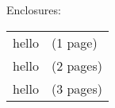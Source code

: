
\renewcommand{\recipprefix}{Subunit\\}
\renewcommand{\recip}{Company}
\renewcommand{\comp}{Program} %
\renewcommand{\recipaddress}{Street\\
City, Prov\hspace{6pt}xxx~xxx\\
Canada}

\renewcommand{\addressprefix}{}
\renewcommand{\addresssuffix}{\\
(604) 222-1047 ext. 6859
| \href{mailto:lighthall@triumf.ca}{lighthall@triumf.ca}\\%
}


\vspace*{2.0\baselineskip}
\noindent Enclosures:\\
\vspace*{-10pt}
\renewcommand{\arraystretch}{1.0} %

\begin{tabular}{ll}%
\hspace{-6pt}hello & (1 page)\\
\hspace{-6pt}hello & (2 pages)\\
\hspace{-6pt}hello & (3 pages)\\
\end{tabular}

\vspace*{2.0\baselineskip}
